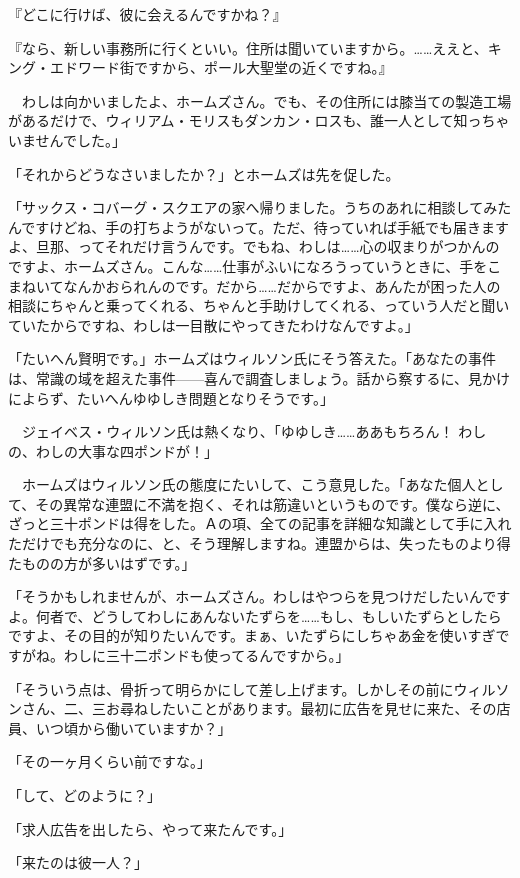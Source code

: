 \documentclass[tate,paper=b6j,jafontsize=9pt]{jlreq}
\begin{document}
『どこに行けば、彼に会えるんですかね？』

『なら、新しい事務所に行くといい。住所は聞いていますから。……ええと、キング・エドワード街ですから、ポール大聖堂の近くですね。』

　わしは向かいましたよ、ホームズさん。でも、その住所には膝当ての製造工場があるだけで、ウィリアム・モリスもダンカン・ロスも、誰一人として知っちゃいませんでした。」

「それからどうなさいましたか？」とホームズは先を促した。

「サックス・コバーグ・スクエアの家へ帰りました。うちのあれに相談してみたんですけどね、手の打ちようがないって。ただ、待っていれば手紙でも届きますよ、旦那、ってそれだけ言うんです。でもね、わしは……心の収まりがつかんのですよ、ホームズさん。こんな……仕事がふいになろうっていうときに、手をこまねいてなんかおられんのです。だから……だからですよ、あんたが困った人の相談にちゃんと乗ってくれる、ちゃんと手助けしてくれる、っていう人だと聞いていたからですね、わしは一目散にやってきたわけなんですよ。」

「たいへん賢明です。」ホームズはウィルソン氏にそう答えた。「あなたの事件は、常識の域を超えた事件------喜んで調査しましょう。話から察するに、見かけによらず、たいへんゆゆしき問題となりそうです。」

　ジェイベス・ウィルソン氏は熱くなり、「ゆゆしき……ああもちろん！ わしの、わしの大事な四ポンドが！」

　ホームズはウィルソン氏の態度にたいして、こう意見した。「あなた個人として、その異常な連盟に不満を抱く、それは筋違いというものです。僕なら逆に、ざっと三十ポンドは得をした。Ａの項、全ての記事を詳細な知識として手に入れただけでも充分なのに、と、そう理解しますね。連盟からは、失ったものより得たものの方が多いはずです。」

「そうかもしれませんが、ホームズさん。わしはやつらを見つけだしたいんですよ。何者で、どうしてわしにあんないたずらを……もし、もしいたずらとしたらですよ、その目的が知りたいんです。まぁ、いたずらにしちゃあ金を使いすぎですがね。わしに三十二ポンドも使ってるんですから。」

「そういう点は、骨折って明らかにして差し上げます。しかしその前にウィルソンさん、二、三お尋ねしたいことがあります。最初に広告を見せに来た、その店員、いつ頃から働いていますか？」

「その一ヶ月くらい前ですな。」

「して、どのように？」

「求人広告を出したら、やって来たんです。」

「来たのは彼一人？」
\end{document}
